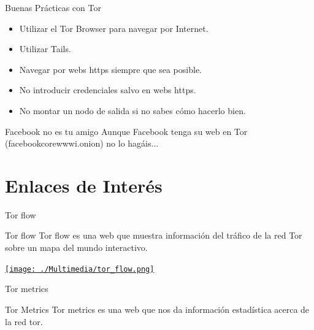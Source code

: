 \documentclass[10pt]{beamer}
\begin{document}
\begin{frame}{Buenas Prácticas con Tor}
	\begin{itemize}
		\item<1-> Utilizar el Tor Browser para navegar por Internet.\pause
		\item<2-> Utilizar Tails.\pause
		\item<3-> Navegar por webs https siempre que sea posible.\pause
		\item<4-> No introducir credenciales salvo en webs https.\pause
		\item<5-> No montar un nodo de salida si no sabes cómo hacerlo bien.\pause
	\end{itemize}
	\begin{alertblock}{Facebook no es tu amigo}
		Aunque Facebook tenga su web en Tor (facebookcorewwwi.onion) no lo hagáis...
	\end{alertblock}
\end{frame}

\section{Enlaces de Interés}

\begin{frame}{Tor flow}
	\pause
	\begin{block}{Tor flow}
		Tor flow es una web que muestra información del tráfico de la red Tor sobre un mapa del mundo interactivo.
	\end{block}
	\pause
	\centering\href{http://torflow.uncharted.software}{\texttt{[image: ./Multimedia/tor\_flow.png]}}
\end{frame}

\begin{frame}{Tor metrics}
	\pause
	\begin{block}{Tor Metrics}
		Tor metrics es una web que nos da información estadística acerca de la red tor.
	\end{block}
	\pause
\end{frame}
\end{document}
